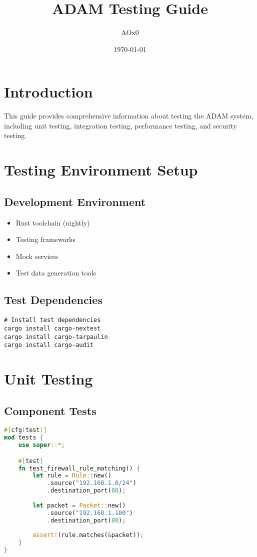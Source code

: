 \documentclass{article}
\title{ADAM Testing Guide}
\author{AOx0}
\date{\today}
\begin{document}
\maketitle

\section{Introduction}
This guide provides comprehensive information about testing the ADAM system, including unit testing, integration testing, performance testing, and security testing.

\section{Testing Environment Setup}

\subsection{Development Environment}
\begin{itemize}
    \item Rust toolchain (nightly)
    \item Testing frameworks
    \item Mock services
    \item Test data generation tools
\end{itemize}

\subsection{Test Dependencies}
\begin{verbatim}
# Install test dependencies
cargo install cargo-nextest
cargo install cargo-tarpaulin
cargo install cargo-audit
\end{verbatim}

\section{Unit Testing}

\subsection{Component Tests}
\begin{lstlisting}[language=rust]
#[cfg(test)]
mod tests {
    use super::*;

    #[test]
    fn test_firewall_rule_matching() {
        let rule = Rule::new()
            .source("192.168.1.0/24")
            .destination_port(80);
        
        let packet = Packet::new()
            .source("192.168.1.100")
            .destination_port(80);
            
        assert!(rule.matches(&packet));
    }
}
\end{lstlisting}
\end{document}
